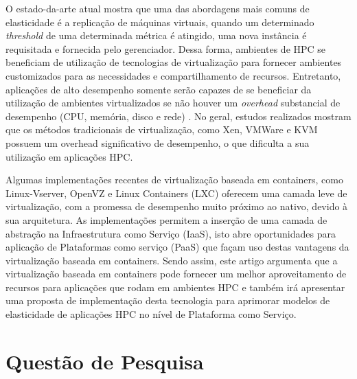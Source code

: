 \documentclass[twoside,english,brazilian]{UNISINOSartigo}
\begin{document}
O estado-da-arte atual mostra que uma das abordagens mais comuns de elasticidade é a replicação de máquinas virtuais, quando um determinado \textit{threshold} de uma determinada métrica é atingido, uma nova instância é requisitada e fornecida pelo gerenciador. Dessa forma, ambientes de HPC se beneficiam de utilização de tecnologias de virtualização para fornecer ambientes customizados para as necessidades e compartilhamento de recursos. Entretanto, aplicações de alto desempenho somente serão capazes de se beneficiar da utilização de ambientes virtualizados se não houver um \textit{overhead} substancial de desempenho (CPU, memória, disco e rede) \cite{Xavier2013}. No geral, estudos realizados mostram que os métodos tradicionais de virtualização, como Xen, VMWare e KVM possuem um overhead significativo de desempenho, o que dificulta a sua utilização em aplicações HPC. 

Algumas implementações recentes de virtualização baseada em containers, como Linux-Vserver, OpenVZ e Linux Containers (LXC) oferecem uma camada leve de virtualização, com a promessa de desempenho muito próximo ao nativo, devido à sua arquitetura. As implementações permitem a inserção de uma camada de abstração na Infraestrutura como Serviço (IaaS), isto abre oportunidades para aplicação de Plataformas como serviço (PaaS) que façam uso destas vantagens da virtualização baseada em containers. Sendo assim, este artigo argumenta que a virtualização baseada em containers pode fornecer um melhor aproveitamento de recursos para aplicações que rodam em ambientes HPC e também irá apresentar uma proposta de implementação desta tecnologia para aprimorar modelos de elasticidade de aplicações HPC no nível de Plataforma como Serviço.



\section{Questão de Pesquisa}
\end{document}
